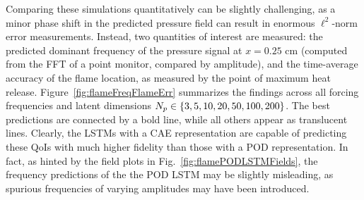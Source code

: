 Comparing these simulations quantitatively can be slightly challenging, as a minor phase shift in the predicted pressure field can result in enormous $\ell^2$-norm error measurements. Instead, two quantities of interest are measured: the predicted dominant frequency of the pressure signal at $x = 0.25$ cm (computed from the FFT of a point monitor, compared by amplitude), and the time-average accuracy of the flame location, as measured by the point of maximum heat release. Figure~\ref{fig:flameFreqFlameErr} summarizes the findings across all forcing frequencies and latent dimensions $N_p \in \{3, 5, 10, 20, 50, 100, 200\}$. The best predictions are connected by a bold line, while all others appear as translucent lines. Clearly, the LSTMs with a CAE representation are capable of predicting these QoIs with much higher fidelity than those with a POD representation. In fact, as hinted by the field plots in Fig.~\ref{fig:flamePODLSTMFields}, the frequency predictions of the the POD LSTM may be slightly misleading, as spurious frequencies of varying amplitudes may have been introduced.